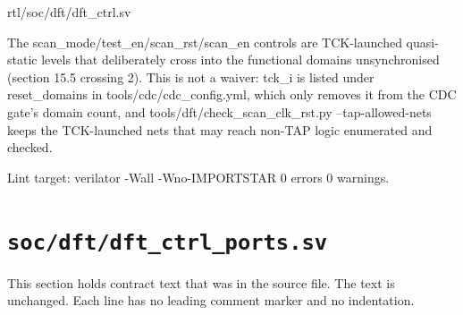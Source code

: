 \begin{relocated}{rtl/soc/dft/dft_ctrl.sv}
\begin{textblock}
The scan_mode/test_en/scan_rst/scan_en controls are TCK-launched quasi-static
levels that deliberately cross into the functional domains unsynchronised
(section 15.5 crossing 2). This is not a waiver: tck_i is listed under
reset_domains in tools/cdc/cdc_config.yml, which only removes it from the CDC
gate's domain count, and tools/dft/check_scan_clk_rst.py --tap-allowed-nets keeps
the TCK-launched nets that may reach non-TAP logic enumerated and checked.

Lint target: verilator -Wall -Wno-IMPORTSTAR 0 errors 0 warnings.
\end{textblock}

\end{relocated}

\section{\texttt{soc/dft/dft\_ctrl\_ports.sv}}\label{ds:mod:dft-ctrl-ports}

This section holds contract text that was in the source file. The text is unchanged. Each line has no leading comment marker and no indentation.

